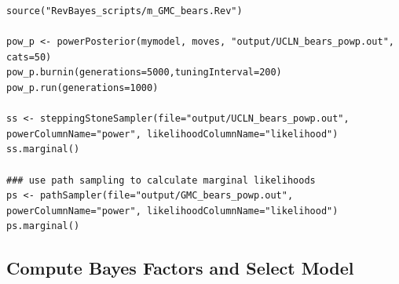 {\tt \begin{snugshade*}
\begin{lstlisting}
source("RevBayes_scripts/m_GMC_bears.Rev")

pow_p <- powerPosterior(mymodel, moves, "output/UCLN_bears_powp.out", cats=50) 
pow_p.burnin(generations=5000,tuningInterval=200)
pow_p.run(generations=1000)  

ss <- steppingStoneSampler(file="output/UCLN_bears_powp.out", powerColumnName="power", likelihoodColumnName="likelihood")
ss.marginal() 

### use path sampling to calculate marginal likelihoods
ps <- pathSampler(file="output/GMC_bears_powp.out", powerColumnName="power", likelihoodColumnName="likelihood")
ps.marginal() 
\end{lstlisting}
\end{snugshade*}}


\FloatBarrier
\subsection{Compute Bayes Factors and Select Model}


